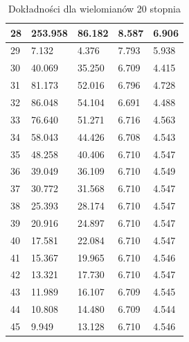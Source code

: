 \documentclass{article}
\begin{document}
\begin{table}[H]
\begin{tabular}{|l|ll|ll|}
    28 & \multicolumn{1}{l|}{253.958} &  86.182 & \multicolumn{1}{l|}{8.587}    &   6.906  \\ \hline
    29 & \multicolumn{1}{l|}{7.132} & 4.376  & \multicolumn{1}{l|}{7.793}    &   5.938  \\ \hline
    30 & \multicolumn{1}{l|}{40.069} &  35.250 & \multicolumn{1}{l|}{6.709}    &   4.415  \\ \hline
    31 & \multicolumn{1}{l|}{81.173} & 52.016  & \multicolumn{1}{l|}{6.796}    &   4.728  \\ \hline
    32 & \multicolumn{1}{l|}{86.048} &  54.104 & \multicolumn{1}{l|}{6.691}    &   4.488  \\ \hline
    33 & \multicolumn{1}{l|}{76.640} & 51.271  & \multicolumn{1}{l|}{6.716}    &   4.563  \\ \hline
    34 & \multicolumn{1}{l|}{58.043} & 44.426  & \multicolumn{1}{l|}{6.708}    &   4.543  \\ \hline
    35 & \multicolumn{1}{l|}{48.258} & 40.406  & \multicolumn{1}{l|}{6.710}    &   4.547  \\ \hline
    36 & \multicolumn{1}{l|}{39.049} &  36.109 & \multicolumn{1}{l|}{6.710}    &   4.549  \\ \hline
    37 & \multicolumn{1}{l|}{30.772} & 31.568  & \multicolumn{1}{l|}{6.710}    &   4.547  \\ \hline
    38 & \multicolumn{1}{l|}{25.393} & 28.174  & \multicolumn{1}{l|}{6.710}    &   4.547  \\ \hline
    39 & \multicolumn{1}{l|}{20.916} & 24.897  & \multicolumn{1}{l|}{6.710}    &   4.547  \\ \hline
    40 & \multicolumn{1}{l|}{17.581} & 22.084  & \multicolumn{1}{l|}{6.710}    &   4.547  \\ \hline
    41 & \multicolumn{1}{l|}{15.367} & 19.965  & \multicolumn{1}{l|}{6.710}    &   4.546  \\ \hline
    42 & \multicolumn{1}{l|}{13.321} & 17.730  & \multicolumn{1}{l|}{6.710}    &   4.547  \\ \hline
    43 & \multicolumn{1}{l|}{11.989} & 16.107  & \multicolumn{1}{l|}{6.709}    &   4.545  \\ \hline
    44 & \multicolumn{1}{l|}{10.808} & 14.480  & \multicolumn{1}{l|}{6.709}    &   4.544  \\ \hline
    45 & \multicolumn{1}{l|}{9.949} & 13.128  & \multicolumn{1}{l|}{6.710}    &   4.546  \\ \hline
\end{tabular}
\caption{Dokładności dla wielomianów 20 stopnia}
\end{table}
\end{document}
